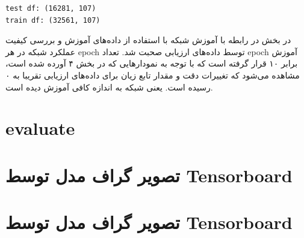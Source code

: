 \documentclass{article}
\begin{document}
\begin{latin}
\begin{lstlisting}
test df: (16281, 107)
train df: (32561, 107)
\end{lstlisting}
\end{latin}

در بخش در رابطه با آموزش شبکه با استفاده از داده‌های آموزش و بررسی کیفیت عملکرد شبکه در هر epoch توسط داده‌های ارزیابی صحبت شد. تعداد epoch آموزش برابر ۱۰ قرار گرفته است که با توجه به نمودارهایی که در بخش ۴ آورده شده است، مشاهده می‌شود که تغییرات دقت و مقدار تابع زیان برای داده‌های ارزیابی تقریبا به ۰ رسیده است. یعنی شبکه به اندازه کافی آموزش دیده است.





\section{
evaluate
}


\section{
تصویر گراف مدل توسط Tensorboard
}


\section{
تصویر گراف مدل توسط Tensorboard
}


\medskip

\small
\LTR 
\latin
\end{document}

